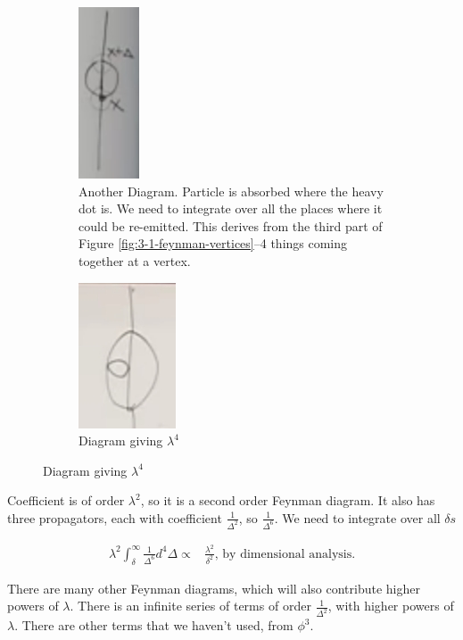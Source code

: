 \documentclass[]{article}
\begin{document}
\begin{figure}[H]
	\begin{center}
		\caption{More diagrams from Figure \ref{fig:mimicking:vertex}}
		\begin{subfigure}[t]{0.45\textwidth}
			\caption{Another Diagram. Particle is absorbed where the heavy dot is. We need to integrate over all the places where it could be re-emitted. This derives from the third part of Figure \ref{fig:3-1-feynman-vertices}--4 things coming together at a vertex.}\label{fig:particles3-another-Feynman}
			\includegraphics{particles3-another-Feynman}
		\end{subfigure}
		\begin{subfigure}[t]{0.45\textwidth}
			\caption{Diagram giving $\lambda^4$}\label{fig:particles3-yet-another-Feynman}
			\includegraphics{particles3-yet-another-Feynman}
		\end{subfigure}
	\end{center}
\end{figure}

Coefficient is of order $\lambda^2$, so it is a second order Feynman diagram. It also has three propagators, each with coefficient $\frac{1}{\Delta^2}$, so $\frac{1}{\Delta^6}$. We need to integrate over all $\delta s$ 

\begin{align*}
	\lambda^2 \int_{\delta}^\infty \frac{1}{\Delta^6} d^4 \Delta \propto& \frac{\lambda^2}{\delta^2} \text{, by dimensional analysis.}
\end{align*}

There are many other Feynman diagrams, which will also contribute higher powers of $\lambda$. There is an infinite series of terms of order $\frac{1}{\Delta^2}$, with higher powers of $\lambda$. There are other terms that we haven't used, from $\phi^3$.
\end{document}

